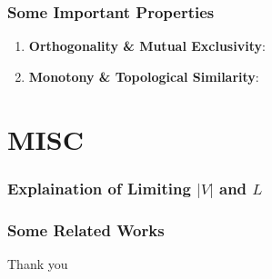 \documentclass[compress,mathserif,xcolor=dvipsnames,svgnames,aspectratio=43]{beamer}
\begin{document}
\begin{frame}[c]
  \frametitle{Some Important Properties}
  \begin{enumerate}
    \item \textbf{Orthogonality \& Mutual Exclusivity}: 
    \item \textbf{Monotony \& Topological Similarity}: 
  \end{enumerate}
\end{frame}


\section{MISC}

\begin{frame}[c]
  \frametitle{Explaination of Limiting $|V|$ and $L$}
  
\end{frame}

\begin{frame}[c]
  \frametitle{Some Related Works}
  \cite{li2019ease}
\end{frame}


\appendix
{}
\setcounter{finalframe}{\value{framenumber}}

\begin{frame} %

\begin{center}
\huge{Thank you}
\end{center}
\end{frame}

\begin{frame}
\tiny{
   
   
}
\end{frame}

\setcounter{framenumber}{\value{finalframe}}
\end{document}
